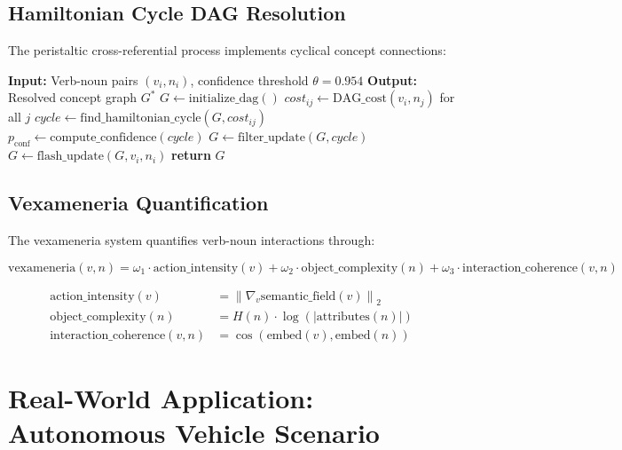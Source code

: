 \documentclass[11pt]{article}
\begin{document}
\subsection{Hamiltonian Cycle DAG Resolution}

The peristaltic cross-referential process implements cyclical concept connections:

\begin{algorithm}
\caption{Peristaltic Cross-Referential Processing}
\begin{algorithmic}
\STATE \textbf{Input:} Verb-noun pairs $(v_i, n_i)$, confidence threshold $\theta = 0.954$
\STATE \textbf{Output:} Resolved concept graph $G^*$
\STATE 
\STATE $G \leftarrow \text{initialize\_dag}()$
    \STATE $cost_{ij} \leftarrow \text{DAG\_cost}(v_i, n_j)$ for all $j$
    \STATE $cycle \leftarrow \text{find\_hamiltonian\_cycle}(G, cost_{ij})$
    \STATE $p_{\text{conf}} \leftarrow \text{compute\_confidence}(cycle)$
        \STATE $G \leftarrow \text{filter\_update}(G, cycle)$
    \ELSE
        \STATE $G \leftarrow \text{flash\_update}(G, v_i, n_i)$
    \ENDIF
\ENDFOR
\STATE \textbf{return} $G$
\end{algorithmic}
\end{algorithm}

\subsection{Vexameneria Quantification}

The vexameneria system quantifies verb-noun interactions through:

\begin{equation}
\text{vexameneria}(v,n) = \omega_1 \cdot \text{action\_intensity}(v) + \omega_2 \cdot \text{object\_complexity}(n) + \omega_3 \cdot \text{interaction\_coherence}(v,n)
\end{equation}

\begin{align}
\text{action\_intensity}(v) &= \left\| \nabla_v \text{semantic\_field}(v) \right\|_2 \\
\text{object\_complexity}(n) &= H(n) \cdot \log(|\text{attributes}(n)|) \\
\text{interaction\_coherence}(v,n) &= \cos(\text{embed}(v), \text{embed}(n))
\end{align}

\section{Real-World Application: Autonomous Vehicle Scenario}
\end{document}
